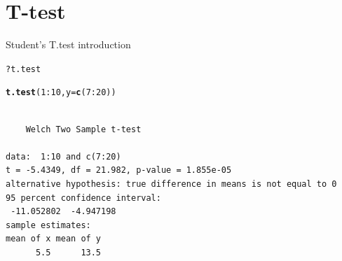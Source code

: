 \documentclass[10pt]{beamer}\usepackage[]{graphicx}\usepackage[]{color}
\makeatletter
\newcommand{\hlnum}[1]{\textcolor[rgb]{0.686,0.059,0.569}{#1}}%
\newcommand{\hlcom}[1]{\textcolor[rgb]{0.678,0.584,0.686}{\textit{#1}}}%
\newcommand{\hlopt}[1]{\textcolor[rgb]{0,0,0}{#1}}%
\newcommand{\hlstd}[1]{\textcolor[rgb]{0.345,0.345,0.345}{#1}}%
\newcommand{\hlkwc}[1]{\textcolor[rgb]{0.333,0.667,0.333}{#1}}%
\newcommand{\hlkwd}[1]{\textcolor[rgb]{0.737,0.353,0.396}{\textbf{#1}}}%
\newenvironment{kframe}{%
 \def\at@end@of@kframe{}%
 \ifinner\ifhmode%
  \def\at@end@of@kframe{\end{minipage}}%
  \begin{minipage}{\columnwidth}%
 \fi\fi%
 \def\FrameCommand##1{\hskip\@totalleftmargin \hskip-\fboxsep
 \colorbox{shadecolor}{##1}\hskip-\fboxsep
     \hskip-\linewidth \hskip-\@totalleftmargin \hskip\columnwidth}%
 \MakeFramed {\advance\hsize-\width
   \@totalleftmargin\z@ \linewidth\hsize
   \@setminipage}}%
 {\par\unskip\endMakeFramed%
 \at@end@of@kframe}
\newenvironment{knitrout}{}{} %
\makeatother
\begin{document}
\section{T-test}

\begin{frame}[fragile]{Student's T.test introduction}%
\begin{knitrout}
\color{fgcolor}\begin{kframe}
\begin{alltt}
\hlopt{?}\hlstd{t.test}
\end{alltt}
\end{kframe}
\end{knitrout}
  
  \pause
\begin{knitrout}
\color{fgcolor}\begin{kframe}
\begin{alltt}
\hlkwd{t.test}\hlstd{(}\hlnum{1}\hlopt{:}\hlnum{10}\hlstd{,} \hlkwc{y} \hlstd{=} \hlkwd{c}\hlstd{(}\hlnum{7}\hlopt{:}\hlnum{20}\hlstd{))}
\end{alltt}
\begin{verbatim}

	Welch Two Sample t-test

data:  1:10 and c(7:20)
t = -5.4349, df = 21.982, p-value = 1.855e-05
alternative hypothesis: true difference in means is not equal to 0
95 percent confidence interval:
 -11.052802  -4.947198
sample estimates:
mean of x mean of y 
      5.5      13.5 
\end{verbatim}
\end{kframe}
\end{knitrout}
  
\end{frame}
\end{document}
